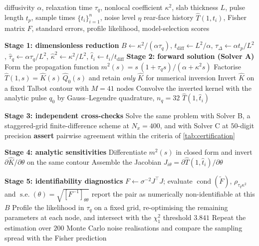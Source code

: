 \documentclass[preprint,12pt,a4paper]{elsarticle}
\theoremstyle{plain}
\theoremstyle{definition}
\theoremstyle{remark}
\newcommand{\tq}{\tau_{q}}
\newcommand{\kk}{\kappa^{2}}
\newcommand{\Bnum}{B}
\begin{document}
\begin{algorithm}[htbp]
\caption{Forward evaluation, sensitivity assembly and identifiability
         diagnostics for the Guyer--Krumhansl rear-face problem.}
\label{alg:main}
\begin{algorithmic}[1]
\Require diffusivity $\alpha$, relaxation time $\tq$, nonlocal coefficient
         $\kk$, slab thickness $L$, pulse length $t_p$, sample times
         $\{t_i\}_{i=1}^{n}$, noise level $\eta$
\Ensure  rear-face history $\hat{T}(1,t_i)$, Fisher matrix $F$, standard errors,
         profile likelihood, model-selection scores

\Statex \textbf{Stage 1: dimensionless reduction}
\State $B \gets \kk/(\alpha\tq)$, \;
       $t_{\mathrm{diff}} \gets L^{2}/\alpha$, \;
       $\tau_{\Delta} \gets \alpha t_{p}/L^{2}$, \;
       $\hat{\tau}_q \gets \alpha\tq/L^{2}$, \;
       $\hat{\kappa}^{2} \gets \kk/L^{2}$, \;
       $\hat{t}_i \gets t_i/t_{\mathrm{diff}}$
       \Statex \textbf{Stage 2: forward solution (Solver A)}
\State Form the propagation function
       $m^{2}(s) = s\,(1+\tq s)/(\alpha + \kk s)$
\State Factorise $\hat{T}(1,s) = \hat{K}(s)\,\hat{Q}_0(s)$ and retain
       \emph{only} $\hat{K}$ for numerical inversion
\State Invert $\hat{K}$ on a fixed Talbot contour with $M=41$ nodes
\State Convolve the inverted kernel with the analytic pulse $q_0$ by
       Gauss--Legendre quadrature, $n_q = 32$
\State \Return $\hat{T}(1,\hat{t}_i)$

\Statex \textbf{Stage 3: independent cross-checks}
\State Solve the same problem with Solver B, a staggered-grid finite-difference
       scheme at $N_x = 400$, and with Solver C at $50$-digit precision
\State \textbf{assert} pairwise agreement within the criteria of
       \cref{tab:certification}

\Statex \textbf{Stage 4: analytic sensitivities}
\For{$\theta \in \{\alpha,\ \tq,\ \kk\}$}
  \State Differentiate $m^{2}(s)$ in closed form and invert
         $\partial\hat{K}/\partial\theta$ on the same contour
\EndFor
\State Assemble the Jacobian $J_{i\theta} = \partial \hat{T}(1,\hat{t}_i)/
       \partial\theta$

\Statex \textbf{Stage 5: identifiability diagnostics}
\State $F \gets \sigma^{-2} J^{\top} J$; evaluate
       $\operatorname{cond}(\tilde F)$, $\rho_{\tq\kk}$ and
       $\operatorname{s.e.}(\theta) = \sqrt{[F^{-1}]_{\theta\theta}}$
  \State report the pair as numerically non-identifiable at this $\Bnum$
\EndIf
\State Profile the likelihood in $\tq$ on a fixed grid, re-optimising the
       remaining parameters at each node, and intersect with the
       $\chi^{2}_{1}$ threshold $3.841$
\State Repeat the estimation over $200$ Monte Carlo noise realisations and
       compare the sampling spread with the Fisher prediction


\end{algorithmic}
\end{algorithm}
\end{document}
